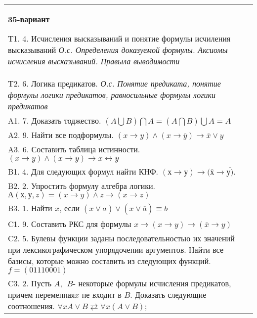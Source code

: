 \documentclass{article}
\begin{document}
\begin{tabular}{m{17cm}}
\textbf{35-вариант}
\newline

T1. 4. Исчисления высказываний и понятие формулы исчиления высказываний \emph{О.с. Определения доказуемой формулы. Аксиомы исчисления высказываний. Правыла выводимости} \\
T2. 6. Логика предикатов. \emph{О.с. Понятие предиката, понятие формулы логики предикатов, равносильные формулы логики предикатов} \\
A1. 7. Доказать тоджество. \((A\bigcup B)\bigcap A = (A\bigcap B)\bigcup A = A\) \\
A2. 9. Найти все подформулы. \((x \rightarrow y) \land (x \rightarrow \overline{y}) \rightarrow \overline{x} \vee y\) \\
A3. 6. Составить таблица истинности. \((x \rightarrow y) \land (x \rightarrow \overline{y}) \rightarrow \overline{x} \leftrightarrow \overline{y}\) \\
B1. 4. Для следующих формул найти КНФ. \((х \rightarrow у) \rightarrow (\overline{х} \rightarrow \overline{у)}\). \\
B2. 2. Упростить формулу алгебра логики. \(А(х,у,z) = (x \rightarrow y) \land z \rightarrow (x \rightarrow z)\) \\
B3. 1. Найти \(x\), если \(\left( \overline{x \vee a} \right) \vee \left( \overline{x \vee \overline{a}} \right) \equiv b\) \\
C1. 9. Составить РКС для формулы \(x \rightarrow (x \rightarrow y) \rightarrow (\overline{x} \rightarrow y)\ \) \\
C2. 5. Булевы функции заданы последовательностью их значений при лексикографическом упорядочении аргументов. Найти все базисы, которые можно составить из следующих функций. \(f = (01110001)\) \\
C3. 2. Пусть \(A,\ \ B\)- некоторые формулы исчисления предикатов, причем переменная\(x\) не входит в \(B\). Доказать следующие соотношения. \(\forall xA \vee B \rightleftarrows \forall x(A \vee B)\); \\

\end{tabular}
\vspace{1cm}
\end{document}

